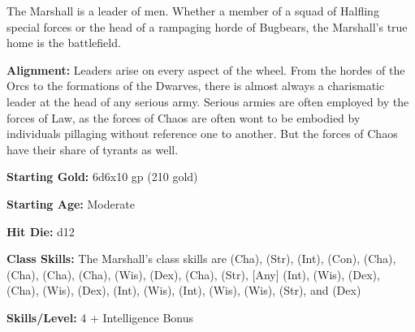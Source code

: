 
The Marshall is a leader of men. Whether a member of a squad of Halfling special forces or the head of a rampaging horde of Bugbears, the Marshall's true home is the battlefield.

\textbf{Alignment:} Leaders arise on every aspect of the wheel. From the hordes of the Orcs to the formations of the Dwarves, there is almost always a charismatic leader at the head of any serious army. Serious armies are often employed by the forces of Law, as the forces of Chaos are often wont to be embodied by individuals pillaging without reference one to another. But the forces of Chaos have their share of tyrants as well.

\textbf{Starting Gold:} 6d6x10 gp (210 gold)

\textbf{Starting Age:} Moderate

\textbf{Hit Die:} d12

\textbf{Class Skills:} The Marshall's class skills are  (Cha),  (Str),  (Int),  (Con),  (Cha),  (Cha),  (Cha),  (Cha),  (Wis),  (Dex),  (Cha),  (Str),  [Any] (Int),  (Wis),  (Dex),  (Cha),  (Wis),  (Dex),  (Int),  (Wis),  (Int),  (Wis),  (Wis),  (Str), and  (Dex)

\textbf{Skills/Level:} 4 + Intelligence Bonus

\goodbab{}
\goodfor{}
\goodref{}
\goodwil{}

\begin{classtable}
\end{classtable}

